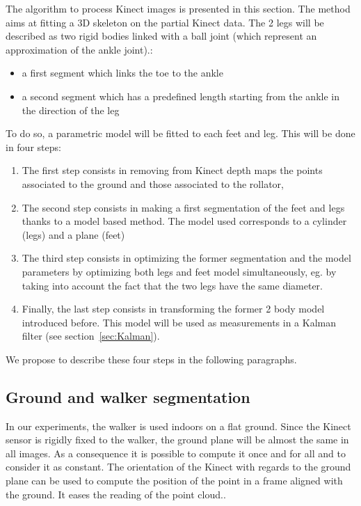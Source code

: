 \documentclass[letterpaper, 10 pt, conference]{ieeeconf}
\newcommand{\CDOK}[2]{{#1}} %
\newcommand{\CJOK}[2]{{#1}} %
\begin{document}
The algorithm to process Kinect images is presented in this section. \CDOK{The method aims at fitting a 3D skeleton on the partial Kinect data. The 2 legs will be described as two rigid bodies linked with a ball joint (which represent an approximation of the ankle joint).}{The goal of the method is to segment  Kinect points cloud (see fig.~\ref{fig:KinectFrames}) in two part (left and right) which are composed by}:
\begin{itemize}
	\item a first segment which links the toe to the ankle
	\item a second segment which has a predefined length starting from the ankle in the direction of the leg
\end{itemize}
\CDOK{To do so}{Moreover}, a \CDOK{parametric}{} model will be \CDOK{fitted}{fit} to each feet and leg. This will be done in four steps:
\begin{enumerate}
	\item The first step consists in removing from Kinect \CDOK{depth maps}{images} the points associated to the ground and those associated to the rollator,
	\item The second step consists in making a first segmentation of the feet and legs thanks to a model based method. The model used corresponds to a cylinder (legs) and a plane (feet)
	\item The third step consists in optimizing the former segmentation and the model parameters by optimizing both legs and feet model simultaneously, eg. by taking into account the fact that the two legs have the same diameter.
	\item Finally, the last step consists in transforming the former 2 body model introduced before. This model will be used as measurements in a Kalman filter (see section~\ref{sec:Kalman}).
\end{enumerate}
We propose to describe these four steps in the following paragraphs.

\subsection{Ground and walker segmentation}
\label{subsec:GroundWalkerSeg}
In our experiments, the walker is used indoors on a flat ground. Since the Kinect sensor is rigidly fixed to the walker, the ground plane will be almost the same in all images. As a consequence it is possible to compute it once and for all and to consider it as constant. \CJOK{}{\footnote{Another solution could consists in detecting the main plane of the 3D points cloud with a RANSAC algortithm.}} \CDOK{The orientation of the Kinect with regards to the ground plane can be used to compute the position of the point in a frame aligned with the ground. It eases the reading of the point cloud.}{Moreover, a rotation matrix can be defined in order to change its orientation to an horizontal plane. At this step, we assume that the we apply this rotation matrix so that the $\mathbf{z}$ axis in the Kinect frame corresponds to the $\mathbf{z}$ axis of the world}.
\end{document}
